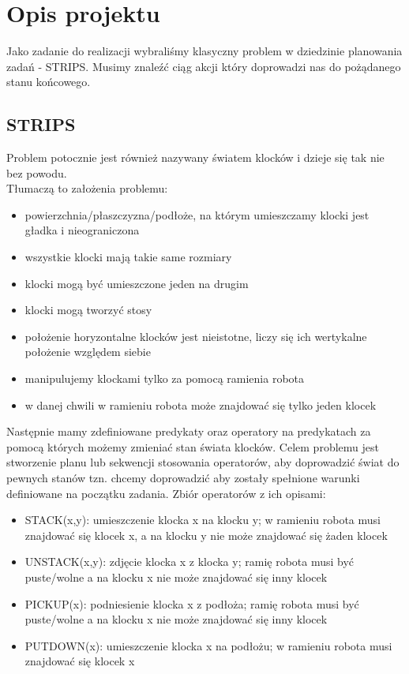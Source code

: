 \documentclass{article}
\begin{document}
\section{Opis projektu}
Jako zadanie do realizacji wybraliśmy klasyczny problem w dziedzinie planowania zadań - STRIPS. Musimy znaleźć ciąg akcji który doprowadzi nas do pożądanego stanu końcowego. 
\subsection{STRIPS}
Problem potocznie jest również nazywany światem klocków i dzieje się tak nie bez powodu. \\
Tłumaczą to założenia problemu:
\begin{itemize}
    \item powierzchnia/płaszczyzna/podłoże, na którym umieszczamy klocki jest gładka i nieograniczona
    \item wszystkie klocki mają takie same rozmiary
    \item klocki mogą być umieszczone jeden na drugim
    \item klocki mogą tworzyć stosy
    \item położenie horyzontalne klocków jest nieistotne, liczy się ich wertykalne położenie względem siebie
    \item manipulujemy klockami tylko za pomocą ramienia robota
    \item w danej chwili w ramieniu robota może znajdować się tylko jeden klocek
\end{itemize}
Następnie mamy zdefiniowane predykaty oraz operatory na predykatach za pomocą których możemy zmieniać stan świata klocków. Celem problemu jest stworzenie planu lub sekwencji stosowania operatorów, aby doprowadzić świat do pewnych stanów tzn. chcemy doprowadzić aby zostały spełnione warunki definiowane na początku zadania.
Zbiór operatorów z ich opisami:
\begin{itemize}
    \item STACK(x,y): umieszczenie klocka x na klocku y; w ramieniu robota musi znajdować się klocek x, a na klocku y nie może znajdować się żaden klocek
    \item UNSTACK(x,y): zdjęcie klocka x z klocka y; ramię robota musi być puste/wolne a na klocku x nie może znajdować się inny klocek
    \item PICKUP(x): podniesienie klocka x z podłoża; ramię robota musi być puste/wolne a na klocku x nie może znajdować się inny klocek
    \item PUTDOWN(x): umieszczenie klocka x na podłożu; w ramieniu robota musi znajdować się klocek x
\end{itemize}
\end{document}
